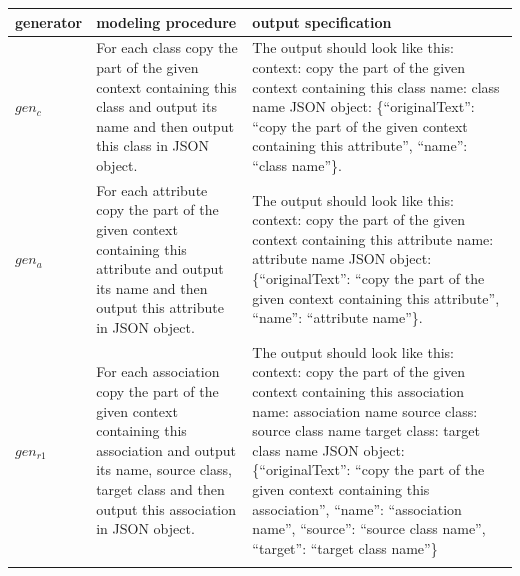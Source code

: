 
\begin{table}[!h]
    \scriptsize
    \centering
    \setlength{\tabcolsep}{0.5em}
\begin{tabular}{@{}l>{\raggedright\arraybackslash}p{}>{\raggedright\arraybackslash}p{}@{}}
        generator & modeling procedure & output specification \\
    \toprule
    \addlinespace
$gen_c$ & For each class copy the part of the given context containing this class and output its name and then output this class in JSON object. & The output should look like this: \newline
context: copy the part of the given context containing this class \newline
name: class name \newline
JSON object: \{``originalText'': ``copy the part of the given context containing this attribute'', ``name'': ``class name''\}. \\
\addlinespace

$gen_a$ & For each attribute copy the part of the given context containing this attribute and output its name and then output this attribute in JSON object. & The output should look like this: \newline
context: copy the part of the given context containing this attribute \newline
name: attribute name \newline
JSON object: \{``originalText'': ``copy the part of the given context containing this attribute'', ``name'': ``attribute name''\}. \\
\addlinespace

$gen_{r1}$ & For each association copy the part of the given context containing this association and output its name, source class, target class and then output this association in JSON object. &
The output should look like this: \newline
context: copy the part of the given context containing this association \newline
name: association name \newline
source class: source class name \newline
target class: target class name \newline
JSON object: \{``originalText'': ``copy the part of the given context containing this association'', ``name'': ``association name'', ``source'': ``source class name'', ``target'': ``target class name''\} \\
\addlinespace


\end{tabular}
\end{table}
